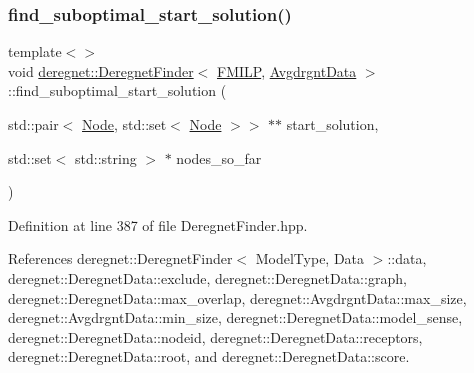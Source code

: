 \subsubsection{\texorpdfstring{find\+\_\+suboptimal\+\_\+start\+\_\+solution()}{find\_suboptimal\_start\_solution()}\hspace{0.1cm}{\footnotesize\ttfamily [3/3]}}
{\footnotesize\ttfamily template$<$$>$ \\
void \hyperlink{classderegnet_1_1DeregnetFinder}{deregnet\+::\+Deregnet\+Finder}$<$ \hyperlink{namespacederegnet_a31759ad43b8b9641205bcf69b09f10c5}{F\+M\+I\+LP}, \hyperlink{classderegnet_1_1AvgdrgntData}{Avgdrgnt\+Data} $>$\+::find\+\_\+suboptimal\+\_\+start\+\_\+solution (\begin{DoxyParamCaption}\item[{std\+::pair$<$ \hyperlink{namespacederegnet_a744bad34f2de9856d36715a445f027f3}{Node}, std\+::set$<$ \hyperlink{namespacederegnet_a744bad34f2de9856d36715a445f027f3}{Node} $>$$>$ $\ast$$\ast$}]{start\+\_\+solution,  }\item[{std\+::set$<$ std\+::string $>$ $\ast$}]{nodes\+\_\+so\+\_\+far }\end{DoxyParamCaption})\hspace{0.3cm}{\ttfamily [inline]}}



Definition at line 387 of file Deregnet\+Finder.\+hpp.



References deregnet\+::\+Deregnet\+Finder$<$ Model\+Type, Data $>$\+::data, deregnet\+::\+Deregnet\+Data\+::exclude, deregnet\+::\+Deregnet\+Data\+::graph, deregnet\+::\+Deregnet\+Data\+::max\+\_\+overlap, deregnet\+::\+Avgdrgnt\+Data\+::max\+\_\+size, deregnet\+::\+Avgdrgnt\+Data\+::min\+\_\+size, deregnet\+::\+Deregnet\+Data\+::model\+\_\+sense, deregnet\+::\+Deregnet\+Data\+::nodeid, deregnet\+::\+Deregnet\+Data\+::receptors, deregnet\+::\+Deregnet\+Data\+::root, and deregnet\+::\+Deregnet\+Data\+::score.


